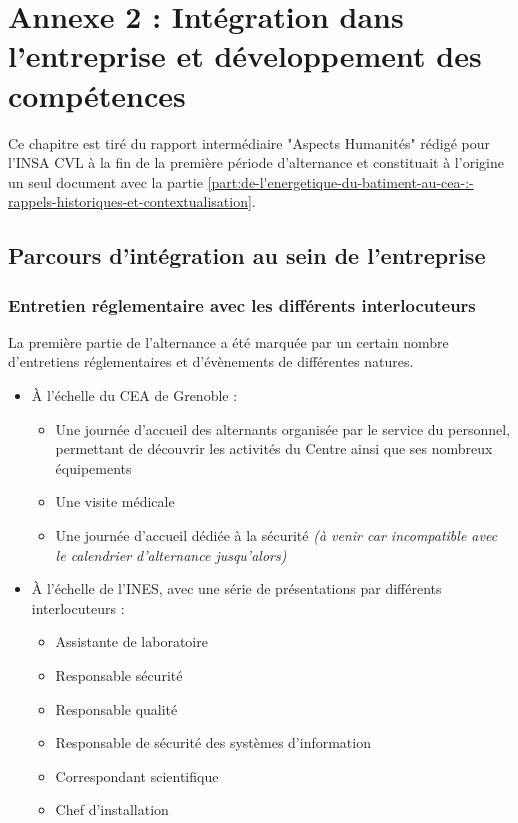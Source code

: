 \chapter*{Annexe 2 : Intégration dans l'entreprise et
développement des compétences}
\setcounter{chapter}{2}

\begin{bluebox}
    Ce chapitre est tiré du rapport intermédiaire "Aspects Humanités" rédigé pour l'INSA CVL à la fin de la première période d'alternance et constituait à l'origine un seul document avec la partie \ref{part:de-l'energetique-du-batiment-au-cea-:-rappels-historiques-et-contextualisation}.
\end{bluebox}

\section{Parcours d'intégration au sein de l'entreprise}\label{ch:parcours-d'integration-au-sein-de-l'entreprise}


\subsection{Entretien réglementaire avec les différents interlocuteurs}\label{subsec:entretien-reglementaire-avec-les-differents-interlocuteurs}

La première partie de l'alternance a été marquée par un certain nombre d'entretiens réglementaires et d'évènements de différentes natures.

\begin{itemize}
    \item À l'échelle du \gls{CEA} de Grenoble :
    \begin{itemize}
        \item Une journée d'accueil des alternants organisée par le service du personnel, permettant de découvrir les activités du Centre ainsi que ses nombreux équipements
        \item Une visite médicale
        \item Une journée d'accueil dédiée à la sécurité \textit{(à venir car incompatible avec le calendrier d'alternance jusqu'alors)}
    \end{itemize}
    \item À l'échelle de l'\gls{INES}, avec une série de présentations par différents interlocuteurs :
    \begin{itemize}
        \item Assistante de laboratoire
        \item Responsable sécurité
        \item Responsable qualité
        \item Responsable de sécurité des systèmes d'information
        \item Correspondant scientifique
        \item Chef d'installation
    \end{itemize}
\end{itemize}
